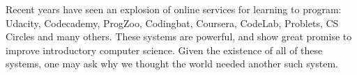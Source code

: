\documentclass{sig-alternate}
\begin{document}
Recent years have seen an explosion of online services for learning
to program:  Udacity\cite{udacity}, Codecademy\cite{codeacademy},
ProgZoo\cite{progzoo}, 
Codingbat\cite{codingbat}, Coursera\cite{coursera}, CodeLab\cite{turingscraft},
Problets\cite{Kumar:2005:GPA:1163405.1163408}, CS Circles\cite{Pritchard:2013:CCI:2445196.2445370} and
many others.  These systems are powerful, and show great promise to
improve introductory computer science.  Given the existence of all of these
systems, one may ask why we thought
the world needed another such system.

%
%
%
%
%
\end{document}
